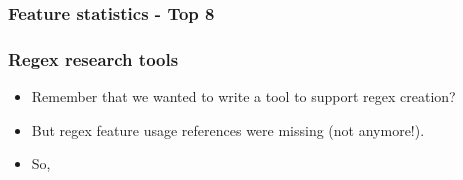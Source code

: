 %

%  
%



\begin{frame}[fragile]
\frametitle{Feature statistics - Top 8}
\begin{center}

\end{center}
\end{frame}



\begin{frame}
\frametitle{Regex research tools}

\begin{itemize}
\item Remember that we wanted to write a tool to support regex creation?
\item<2-> But regex feature usage references were missing (not anymore!).
\item <3-> So, 
\end{itemize}


\end{frame}


